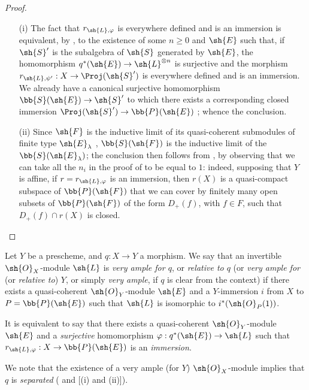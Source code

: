 \begin{proof}
\medskip\noindent
\begin{enumerate}
  \item[\rm{(i)}] The fact that $r_{\sh{L},\varphi}$ is everywhere defined and is an immersion is equivalent, by , to the existence of some $n\geq0$ and $\sh{E}$ such that, if $\sh{S}'$ is the subalgebra of $\sh{S}$ generated by $\sh{E}$, the homomorphism $q^*(\sh{E})\to\sh{L}^{\otimes n}$ is surjective and the morphism $r_{\sh{L},\psi'}:X\to\Proj(\sh{S}')$ is everywhere defined and is an immersion.
    We already have a canonical surjective homomorphism $\bb{S}(\sh{E})\to\sh{S}'$ to which there exists a corresponding closed immersion $\Proj(\sh{S}')\to\bb{P}(\sh{E})$ ;
    whence the conclusion.
  \item[\rm{(ii)}] Since $\sh{F}$ is the inductive limit of its quasi-coherent submodules of finite type $\sh{E}_\lambda$ , $\bb{S}(\sh{F})$ is the inductive limit of the $\bb{S}(\sh{E}_\lambda)$;
    the conclusion then follows from , by observing that we can take all the $n_i$ in the proof of  to be equal to $1$:
    indeed, supposing that $Y$ is affine, if $r=r_{\sh{L},\varphi}$ is an immersion, then $r(X)$ is a quasi-compact subspace of $\bb{P}(\sh{F})$ that we can cover by finitely many open subsets of $\bb{P}(\sh{F})$ of the form $D_+(f)$, with $f\in F$, such that $D_+(f)\cap r(X)$ is closed.
\end{enumerate}
\end{proof}

\begin{definition}[4.4.2]
\label{II.4.4.2}
Let $Y$ be a prescheme, and $q:X\to Y$ a morphism.
We say that an invertible $\sh{O}_X$-module $\sh{L}$ is \emph{very ample for $q$}, or \emph{relative to $q$} (or \emph{very ample for} (or \emph{relative to}) \emph{$Y$}, or simply \emph{very ample}, if $q$ is clear from the context) if there exists a quasi-coherent $\sh{O}_Y$-module $\sh{E}$ and a $Y$-immersion $i$ from $X$ to $P=\bb{P}(\sh{E})$ such that $\sh{L}$ is isomorphic to $i^*(\sh{O}_P(1))$.
\end{definition}

It is equivalent  to say that there exists a quasi-coherent $\sh{O}_Y$-module $\sh{E}$ and a \emph{surjective} homomorphism $\varphi:q^*(\sh{E})\to\sh{L}$ such that $r_{\sh{L},\varphi}:X\to\bb{P}(\sh{E})$ is an \emph{immersion}.

We note that the existence of a very ample (for $Y$) $\sh{O}_X$-module implies that $q$ is \emph{separated} ( and [(i) and (ii)]).

